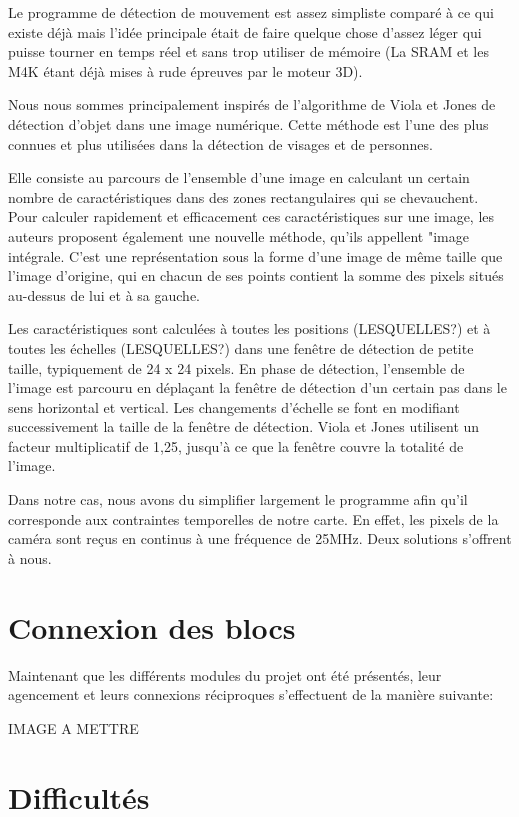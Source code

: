 \documentclass[10pt,a4paper]{report}
\begin{document}
Le programme de détection de mouvement est assez simpliste comparé à ce qui existe déjà mais l'idée principale était de faire quelque chose d'assez léger qui puisse tourner en temps réel et sans trop utiliser de mémoire (La SRAM et les M4K étant déjà mises à rude épreuves par le moteur 3D). 

Nous nous sommes principalement inspirés de l'algorithme de Viola et Jones de détection d'objet dans une image numérique. Cette méthode est l'une des plus connues et plus utilisées dans la détection de visages et de personnes. 

Elle consiste au parcours de l'ensemble d'une image en calculant un certain nombre de caractéristiques dans des zones rectangulaires qui se chevauchent. Pour calculer rapidement et efficacement ces caractéristiques sur une image, les auteurs proposent également une nouvelle méthode, qu'ils appellent "image intégrale. C'est une représentation sous la forme d'une image de même taille que l'image d'origine, qui en chacun de ses points contient la somme des pixels situés au-dessus de lui et à sa gauche.


Les caractéristiques sont calculées à toutes les positions (LESQUELLES?) et à toutes les échelles (LESQUELLES?) dans une fenêtre de détection de petite taille, typiquement de 24 x 24 pixels. En phase de détection, l'ensemble de l'image est parcouru en déplaçant la fenêtre de détection d'un certain pas dans le sens horizontal et vertical. Les changements d'échelle se font en modifiant successivement la taille de la fenêtre de détection. Viola et Jones utilisent un facteur multiplicatif de 1,25, jusqu'à ce que la fenêtre couvre la totalité de l'image.

Dans notre cas, nous avons du simplifier largement le programme afin qu'il corresponde aux contraintes temporelles de notre carte. En effet, les pixels de la caméra sont reçus en continus à une fréquence de 25MHz. Deux solutions s'offrent à nous.

\chapter{Connexion des blocs}

Maintenant que les différents modules du projet ont été présentés, leur agencement et leurs connexions réciproques s'effectuent de la manière suivante:

IMAGE A METTRE 

\chapter{Difficultés}
\end{document}

